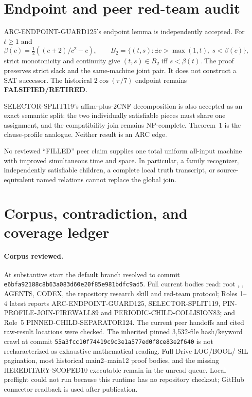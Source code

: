 \documentclass[11pt]{article}
\begin{document}
\section{Endpoint and peer red-team audit}
ARC-ENDPOINT-GUARD125's endpoint lemma is independently accepted.  For
$t\ge1$ and
\[
 \beta(c)=\tfrac12((c+2)/c^2-c),\qquad
 B_2=\{(t,s):\exists c>\max(1,t),\ s<\beta(c)\},
\]
strict monotonicity and continuity give $(t,s)\in B_2$ iff
$s<\beta(t)$.  The proof preserves strict slack and the same-machine joint
pair.  It does not construct a SAT successor.  The historical
$2\cos(\pi/7)$ endpoint remains \textbf{FALSIFIED/RETIRED}.

SELECTOR-SPLIT119's affine-plus-2CNF decomposition is also accepted as an
exact semantic split: the two individually satisfiable pieces must share
one assignment, and the compatibility join remains NP-complete.  Theorem~1
is the clause-profile analogue.  Neither result is an ARC edge.

No reviewed ``FILLED'' peer claim supplies one total uniform all-input
machine with improved simultaneous time and space.  In particular, a
family recognizer, independently satisfiable children, a complete local
truth transcript, or source-equivalent named relations cannot replace the
global join.

\section{Corpus, contradiction, and coverage ledger}
\paragraph{Corpus reviewed.}
At substantive start the default branch resolved to commit
\texttt{e6bfa92188c8b63a083d60e20f85e981bdfc9ad5}.  Full current bodies read:
root , , AGENTS, CODEX, the repository
research skill and red-team protocol; Roles 1--4 latest reports
ARC-ENDPOINT-GUARD125, SELECTOR-SPLIT119,
PIN-PROFILE-JOIN-FIREWALL89 and PERIODIC-CHILD-COLLISION83; and Role~5
PINNED-CHILD-SEPARATOR124.  The current peer handoffs and cited raw-result
locations were checked.  The inherited pinned 3,532-file hash/keyword crawl
at commit \texttt{55a3fcc10f74419c9c3e1a577ed0f8ce83e2f640} is not
recharacterized as exhaustive mathematical reading.  Full Drive LOG/BOOL/
SIL pagination, most historical main2--main12 proof bodies, and the missing
HEREDITARY-SCOPED10 executable remain in the unread queue.  Local preflight
could not run because this runtime has no repository checkout; GitHub
connector readback is used after publication.
\end{document}
